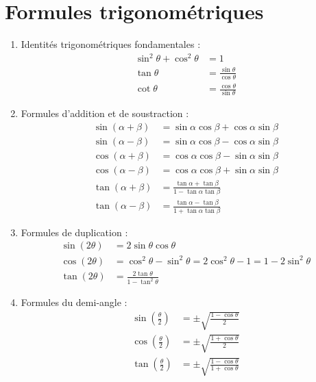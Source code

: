 \section{Formules trigonométriques}
\begin{enumerate}
    \item Identités trigonométriques fondamentales :
    \begin{align*}
        \sin^2 \theta + \cos^2 \theta &= 1 \\
        \tan \theta &= \frac{\sin \theta}{\cos \theta} \\
        \cot \theta &= \frac{\cos \theta}{\sin \theta}
    \end{align*}
    \item Formules d'addition et de soustraction :
    \begin{align*}
        \sin(\alpha + \beta) &= \sin \alpha \cos \beta + \cos \alpha \sin \beta \\
        \sin(\alpha - \beta) &= \sin \alpha \cos \beta - \cos \alpha \sin \beta \\
        \cos(\alpha + \beta) &= \cos \alpha \cos \beta - \sin \alpha \sin \beta \\
        \cos(\alpha - \beta) &= \cos \alpha \cos \beta + \sin \alpha \sin \beta \\
        \tan(\alpha + \beta) &= \frac{\tan \alpha + \tan \beta}{1 - \tan \alpha \tan \beta} \\
        \tan(\alpha - \beta) &= \frac{\tan \alpha - \tan \beta}{1 + \tan \alpha \tan \beta}
    \end{align*}
    \item Formules de duplication :
    \begin{align*}
        \sin(2\theta) &= 2 \sin \theta \cos \theta \\
        \cos(2\theta) &= \cos^2 \theta - \sin^2 \theta = 2 \cos^2 \theta - 1 = 1 - 2 \sin^2 \theta \\
        \tan(2\theta) &= \frac{2 \tan \theta}{1 - \tan^2 \theta}
    \end{align*}
    \item Formules du demi-angle :
    \begin{align*}
        \sin\left(\frac{\theta}{2}\right) &= \pm \sqrt{\frac{1 - \cos \theta}{2}} \\
        \cos\left(\frac{\theta}{2}\right) &= \pm \sqrt{\frac{1 + \cos \theta}{2}} \\
        \tan\left(\frac{\theta}{2}\right) &= \pm \sqrt{\frac{1 - \cos \theta}{1 + \cos \theta}}

\end{align*}
\end{enumerate}
